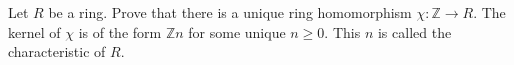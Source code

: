 Let $R$ be a ring. Prove that there is a unique ring homomorphism $\chi: \mathbb{Z} \to R$. The kernel of $\chi$ is of the form $\mathbb{Z}n$ for some unique $n \geq 0$. This $n$ is called the characteristic of $R$.
